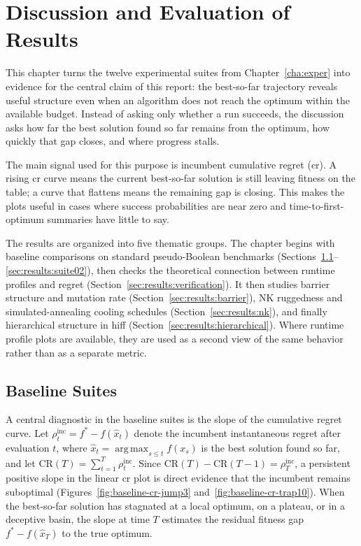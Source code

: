 \chapter{Discussion and Evaluation of Results}
\label{cha:results}

This chapter turns the twelve experimental suites from
Chapter~\ref{cha:exper} into evidence for the central claim of this
report: the best-so-far trajectory reveals useful structure even when
an algorithm does not reach the optimum within the available budget.
Instead of asking only whether a run succeeds, the discussion asks how
far the best solution found so far remains from the optimum, how quickly
that gap closes, and where progress stalls.

The main signal used for this purpose is incumbent cumulative regret
(\acrshort{cr}). A rising \acrshort{cr} curve means the current
best-so-far solution is still leaving fitness on the table; a curve that
flattens means the remaining gap is closing. This makes the plots useful
in cases where success probabilities are near zero and
time-to-first-optimum summaries have little to say.

The results are organized into five thematic groups. The chapter begins
with baseline comparisons on standard pseudo-Boolean benchmarks
(Sections~\ref{sec:results:baseline}--\ref{sec:results:suite02}), then
checks the theoretical connection between runtime profiles and regret
(Section~\ref{sec:results:verification}). It then studies barrier
structure and mutation rate (Section~\ref{sec:results:barrier}), NK
ruggedness and simulated-annealing cooling schedules
(Section~\ref{sec:results:nk}), and finally hierarchical structure in
\acrshort{hiff} (Section~\ref{sec:results:hierarchical}). Where runtime
profile plots are available, they are used as a second view of the same
behavior rather than as a separate metric.


\section{Baseline Suites}
\label{sec:results:baseline}
A central diagnostic in the baseline suites is the slope of the
cumulative regret curve. Let $\rho_t^{\mathrm{inc}} = f^{*} -
f(\hat{x}_t)$ denote the incumbent instantaneous regret after
evaluation $t$, where $\hat{x}_t = \operatorname{arg\,max}_{s \leq t}
f(x_s)$ is the best solution found so far, and let
$\mathrm{CR}(T) = \sum_{t=1}^{T} \rho_t^{\mathrm{inc}}$. Since
$\mathrm{CR}(T) - \mathrm{CR}(T-1) = \rho_T^{\mathrm{inc}}$, a
persistent positive slope in the linear \acrshort{cr} plot is
direct evidence that the incumbent remains suboptimal
(Figures~\ref{fig:baseline-cr-jump3} and~\ref{fig:baseline-cr-trap10}). When the
best-so-far solution has stagnated at a local optimum, on a plateau,
or in a deceptive basin, the slope at time $T$ estimates the residual
fitness gap $f^{*} - f(\hat{x}_T)$ to the true optimum.

